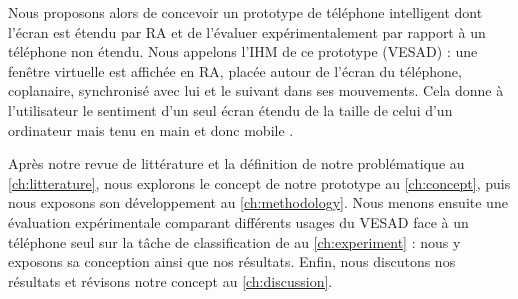 

Nous proposons alors de concevoir un prototype de téléphone intelligent dont l'écran est étendu par RA et de l'évaluer expérimentalement par rapport à un téléphone non étendu. Nous appelons l'IHM de ce prototype  (VESAD) : une fenêtre virtuelle est affichée en RA, placée autour de l'écran du téléphone, coplanaire, synchronisé avec lui et le suivant dans ses mouvements. Cela donne à l'utilisateur le sentiment d'un seul écran étendu de la taille de celui d'un ordinateur mais tenu en main et donc mobile .

Après notre revue de littérature et la définition de notre problématique au \autoref{ch:litterature}, nous explorons le concept de notre prototype au \autoref{ch:concept}, puis nous exposons son développement au \autoref{ch:methodology}. Nous menons ensuite une évaluation expérimentale comparant différents usages du VESAD face à un téléphone seul sur la tâche de classification de \cite{Liu2014} au \autoref{ch:experiment} : nous y exposons sa conception ainsi que nos résultats. Enfin, nous discutons nos résultats et révisons notre concept au \autoref{ch:discussion}.